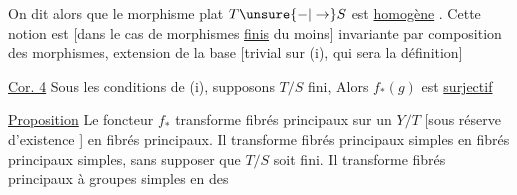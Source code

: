 On dit alors que le morphisme  plat
$T\unsure{\mathbin{-}|\to} S$ est \uline{homogène} . Cette notion est [dans le
cas de morphismes \uline{finis} du moins]
invariante par composition des morphismes,
extension de la base [trivial sur (i), qui
sera la définition]



\uline{Cor. 4} Sous les conditions de (i), supposons
$T/S$ fini,  
Alors $f_\ast(g)$ est \uline{surjectif}

\uline{Proposition} Le foncteur $f_\ast$ transforme
fibrés  principaux sur un $Y/T$
[sous réserve d'existence ] en
fibrés  principaux.
Il transforme fibrés principaux
simples en fibrés principaux
simples, sans supposer que $T/S$ soit fini.
Il transforme  fibrés principaux à groupes
  simples  en  des

